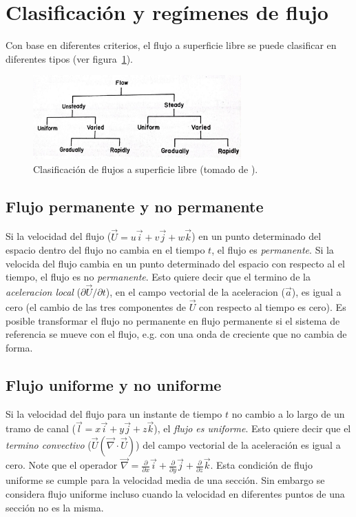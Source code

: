 \documentclass[11pt, oneside]{article}
\begin{document}
\section{Clasificaci\'on y reg\'imenes de flujo} %
Con base en diferentes criterios, el flujo a superficie libre se puede clasificar en diferentes tipos (ver figura~\ref{fig4}).

\begin{figure}[h]
\centering
\includegraphics[width=8cm]{fig4.jpeg}
\caption{Clasificaci\'on de flujos a superficie libre (tomado de \cite{Chau}).}
\label{fig4}
\end{figure}

\subsection{Flujo permanente y no permanente}
Si la velocidad del flujo ($\vec{U}= u\vec{i} + v\vec{j} + w\vec{k}$) en un punto determinado del espacio dentro del flujo no cambia en el tiempo $t$, el flujo es \emph{permanente}. Si la velocida del flujo cambia en un punto determinado del espacio con respecto al el tiempo, el flujo es no \emph{permanente}. Esto quiere decir que el termino de la \emph{aceleracion local} ($\partial{\vec{U}}/\partial{t}$), en el campo vectorial de la aceleracion ($\vec{a}$), es igual a cero (el cambio de las tres componentes de $\vec{U}$ con respecto al tiempo es cero). Es posible transformar el flujo no permanente en flujo permanente si el sistema de referencia se mueve con el flujo, e.g. con una onda de creciente que no cambia de forma.  

\subsection{Flujo uniforme y no uniforme}
Si la velocidad del flujo para un instante de tiempo $t$ no cambio a lo largo de un tramo de canal ($\vec{l} = x\vec{i} + y\vec{j} + z\vec{k}$), el \emph{flujo es uniforme}. Esto quiere decir que el \emph{termino convectivo} ($\vec{U} ( \vec{\nabla} \cdot \vec{U} )$) del  campo vectorial de la aceleraci\'on es igual a cero. Note que el operador $\vec{\nabla}=\frac{\partial}{\partial x} \vec{i} + \frac{\partial}{\partial y} \vec{j} + \frac{\partial}{\partial z} \vec{k}$. Esta condici\'on de flujo uniforme se cumple para la velocidad media de una secci\'on. Sin embargo se considera flujo uniforme incluso cuando la velocidad en diferentes puntos de una secci\'on no es la misma. 
\end{document}
